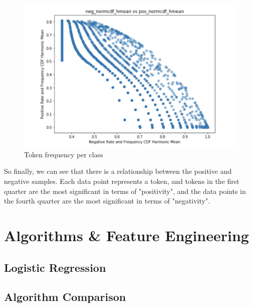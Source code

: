 \documentclass{article}
\begin{document}
	\begin{figure}[h]
		\label{Figure 12}
		\caption{Token frequency per class}
		\includegraphics[scale=0.55]{norcdf.png}
		\centering
	\end{figure}


So finally, we can see that there is a relationship between the positive and negative samples. Each data point represents a token, and tokens in the first quarter are the most significant in terms of "positivity", and the data points in the fourth quarter are the most significant in terms of "negativity".


	
	\section{Algorithms \& Feature Engineering}
	\subsection{Logistic Regression}
	\subsection{Algorithm Comparison}
	
\end{document}
